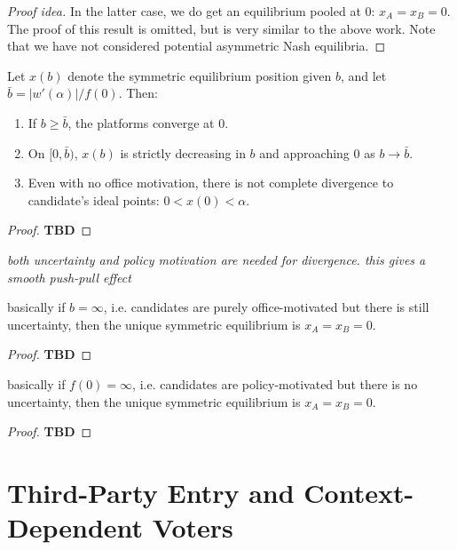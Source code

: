 \documentclass[../../../main.tex]{subfiles}
\begin{document}
\begin{theorem}
\begin{proof}[Proof idea]
        In the latter case, we do get an equilibrium pooled at 0: $x_A=x_B=0$. The proof of this result is omitted, but is very similar to the above work. 
        Note that we have not considered potential asymmetric Nash equilibria.
    \end{proof}
\end{theorem}

\begin{corollary}
    Let $x(b)$ denote the symmetric equilibrium position given $b$, and let $\bar b=|w'(\alpha)|/f(0)$. Then:
    \begin{enumerate}
        \item If $b\geq \bar b$, the platforms converge at 0.
        \item On $[0,\bar b)$, $x(b)$ is strictly decreasing in $b$ and approaching $0$ as $b\rightarrow \bar b$.
        \item Even with no office motivation, there is not complete divergence to candidate's ideal points: $0<x(0)<\alpha$.
    \end{enumerate}
    \begin{proof}
        \textbf{TBD}
    \end{proof}
\end{corollary}

\textit{both uncertainty and policy motivation are needed for divergence. this gives a smooth push-pull effect}

\begin{proposition}
    basically if $b=\infty$, i.e. candidates are purely office-motivated but there is still uncertainty, then the unique symmetric equilibrium is $x_A=x_B=0$.
    \begin{proof}
        \textbf{TBD}
    \end{proof}
\end{proposition}

\begin{proposition}
    basically if $f(0)=\infty$, i.e. candidates are policy-motivated but there is no uncertainty, then the unique symmetric equilibrium is $x_A=x_B=0$.
    \begin{proof}
        \textbf{TBD}
    \end{proof}
\end{proposition}

\section{Third-Party Entry and Context-Dependent Voters}
\end{document}
